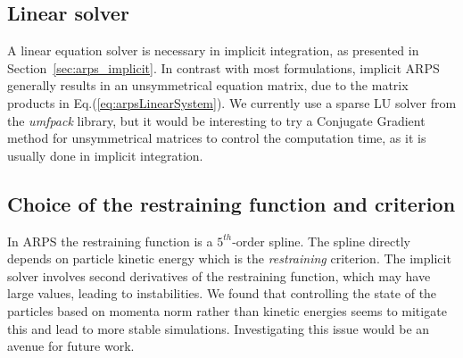 \subsection{Linear solver}
A linear equation solver is necessary in implicit integration, as presented in Section~\ref{sec:arps_implicit}.
In contrast with most formulations, implicit ARPS generally results in an unsymmetrical equation matrix, due to the matrix products in Eq.(\ref{eq:arpsLinearSystem}).
We currently use a sparse LU solver from the \emph{umfpack} library, but it would be interesting to try a Conjugate Gradient method for unsymmetrical matrices to control the computation time, as it is usually done in implicit integration.

\subsection{Choice of the restraining function and criterion}
In ARPS the restraining function is a $5^{th}$-order spline.
The spline directly depends on particle kinetic energy which is the \emph{restraining} criterion.
The implicit solver involves second derivatives of the restraining function, which may have large values, leading to instabilities.
We found that controlling the state of the particles based on momenta norm rather than kinetic energies seems to mitigate this and lead to more stable simulations.
Investigating this issue would be an avenue for future work.

